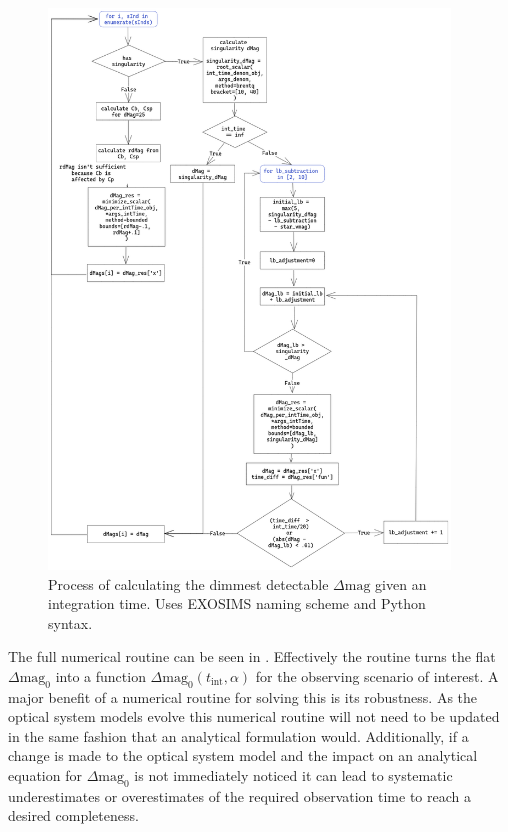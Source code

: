 \begin{figure}
  \begin{center}
    \includegraphics[width=0.95\textwidth]{ch2/figures/root_flowchart.png}
  \end{center}
  \caption{Process of calculating the dimmest detectable $\Delta\textrm{mag}$ given
  an integration time. Uses EXOSIMS naming scheme and Python syntax.}
  \label{fig:root_flowchart}
\end{figure}

The full numerical routine can be seen in .
Effectively the routine turns the flat $\Delta\textrm{mag}_0$ into a function
$\Delta\textrm{mag}_0(t_\textrm{int}, \alpha)$ for the observing scenario of
interest. A major benefit of a numerical routine for solving this is its
robustness. As the optical system models evolve this numerical routine will not
need to be updated in the same fashion that an analytical formulation would.
Additionally, if a change is made to the optical system model and the impact
on an analytical equation for $\Delta\textrm{mag}_0$ is not immediately noticed
it can lead to systematic underestimates or overestimates of the required
observation time to reach a desired completeness.

